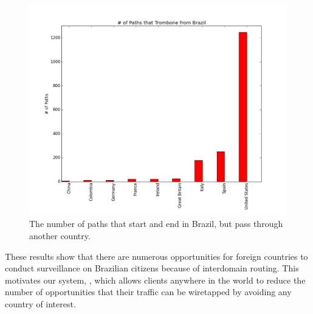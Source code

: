 \begin{figure}
\centering
\includegraphics[width=.5\textwidth]{trombone_graph}
\caption{The number of paths that start and end in Brazil, but pass through another country.}
\label{fig:trombone}
\end{figure}

These results show that there are numerous opportunities for foreign countries to conduct surveillance on Brazilian citizens because of interdomain routing.  This motivates our system, \system{}, which allows clients anywhere in the world to reduce the number of opportunities that their traffic can be wiretapped by avoiding any country of interest.  
